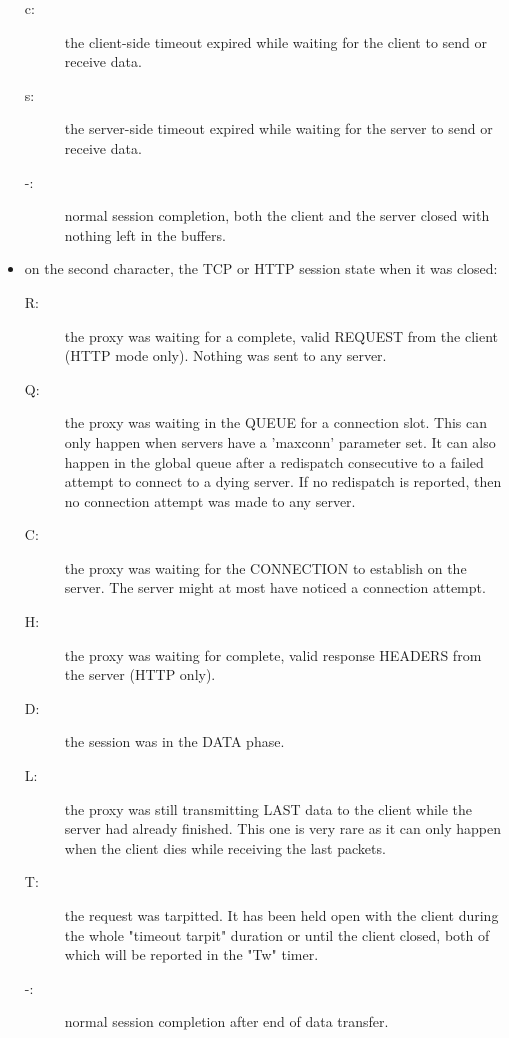 \begin{itemize}
\begin{description}
    \item[c:]
            the client-side timeout expired while waiting for the client to
            send or receive data.
    \item[s:]
            the server-side timeout expired while waiting for the server to
            send or receive data.
    \item[-:]
            normal session completion, both the client and the server closed
            with nothing left in the buffers.
    \end{description}
    
\item
     on the second character, the TCP or HTTP session state when it was closed:
     
        \begin{description}
        \item[R:]
            the proxy was waiting for a complete, valid REQUEST from the client
            (HTTP mode only). Nothing was sent to any server.
        \item[Q:]
            the proxy was waiting in the QUEUE for a connection slot. This can
            only happen when servers have a 'maxconn' parameter set. It can
            also happen in the global queue after a redispatch consecutive to
            a failed attempt to connect to a dying server. If no redispatch is
            reported, then no connection attempt was made to any server.
        \item[C:]
            the proxy was waiting for the CONNECTION to establish on the
            server. The server might at most have noticed a connection attempt.
        \item[H:]
            the proxy was waiting for complete, valid response HEADERS from the
            server (HTTP only).
        \item[D:]
            the session was in the DATA phase.
        \item[L:]
            the proxy was still transmitting LAST data to the client while the
            server had already finished. This one is very rare as it can only
            happen when the client dies while receiving the last packets.
        \item[T:]
            the request was tarpitted. It has been held open with the client
            during the whole "timeout tarpit" duration or until the client
            closed, both of which will be reported in the "Tw" timer.
        \item[-:]
            normal session completion after end of data transfer.
        \end{description}


\end{itemize}
